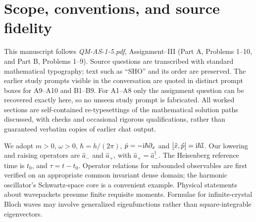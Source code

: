 \documentclass[11pt,a4paper]{article}
\begin{document}
\begin{abstract}
This pedagogical manuscript compiles all ten short-answer (Part A) and nine long-answer (Part B) questions of Quantum Mechanics--I Assignment III from the uploaded SRMIST course sheet. Every problem retains the original question in its original order with mathematical symbols typeset consistently; the full follow-up user instruction is included for Problems A9--A10 and B1--B9, where exact text is available from the conversation. Solutions are organized as newly typeset, detailed derivations based on the answers developed in the study discussion; exact verbatim recovery of every previous assistant message, especially A1--A8, is not asserted. The treatments cover oscillator factorization, ladder and number operators, asymptotic Hermite functions, picture equivalence, general and special Ehrenfest relations, unitarity and the propagator, Bloch--Floquet structure, oscillator zero-point energy and uncertainty, conservation laws, and exact Heisenberg evolution. The exposition includes operator-order checks, domain caveats, examples, and concise examination-ready deductions. This is an educational preprint rather than a new research contribution or a peer-reviewed publication.
\end{abstract}
{\footnotesize\setlength{\parskip}{0pt}\tableofcontents}
\clearpage
\section{Scope, conventions, and source fidelity}
This manuscript follows \emph{QM-AS-1-5.pdf}, Assignment--III (Part A, Problems 1--10, and Part B, Problems 1--9). Source questions are transcribed with standard mathematical typography; text such as ``SHO'' and its order are preserved. The earlier study prompts visible in the conversation are quoted in distinct prompt boxes for A9--A10 and B1--B9. For A1--A8 only the assignment question can be recovered exactly here, so no unseen study prompt is fabricated. All worked sections are self-contained re-typesettings of the mathematical solution paths discussed, with checks and occasional rigorous qualifications, rather than guaranteed verbatim copies of earlier chat output.

We adopt \(m>0\), \(\omega>0\), \(\hbar=h/(2\pi)\), \(\hat p=-\mathrm{i}\hbar\partial_x\) and \([\hat x,\hat p]=\mathrm{i}\hbar\mathbb I\). Our lowering and raising operators are \(\hat a_-\) and \(\hat a_+\), with \(\hat a_+=\hat a_-^\dagger\). The Heisenberg reference time is \(t_0\), and \(\tau=t-t_0\). Operator relations for unbounded observables are first verified on an appropriate common invariant dense domain; the harmonic oscillator's Schwartz-space core is a convenient example. Physical statements about wavepackets presume finite requisite moments. Formulae for infinite-crystal Bloch waves may involve generalized eigenfunctions rather than square-integrable eigenvectors.
\end{document}
